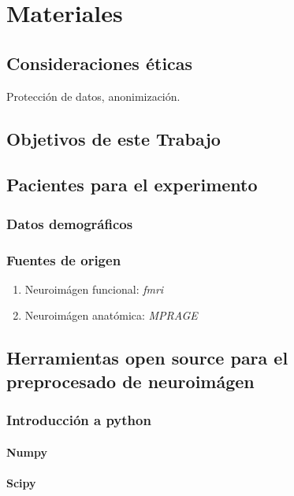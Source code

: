 \chapter{Materiales}
\section{Consideraciones éticas}
Protección de datos, anonimización.
\section{Objetivos de este Trabajo}
\section{Pacientes para el experimento}

\subsection{Datos demográficos}

\subsection{Fuentes de origen}

\begin{enumerate}
\item Neuroimágen funcional: \textit{fmri}
\item Neuroimágen anatómica: \textit{MPRAGE}
\end{enumerate}

\section{Herramientas open source para el preprocesado de neuroimágen}

\subsection{Introducción a python}

\subsubsection{Numpy}
\subsubsection{Scipy}
